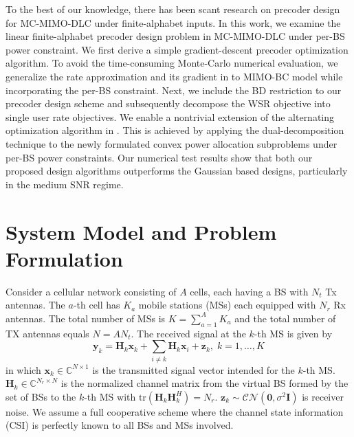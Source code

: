 \documentclass{article}
\begin{document}
To the best of our knowledge, there has been scant research on precoder design for MC-MIMO-DLC under finite-alphabet inputs.
In this work, we examine the linear finite-alphabet precoder design problem in MC-MIMO-DLC under per-BS power constraint.
We first derive a simple gradient-descent precoder optimization algorithm. To avoid the time-consuming Monte-Carlo numerical evaluation,
we generalize the rate approximation and its gradient in \cite{zeng2012low} to MIMO-BC model \cite{wu2012linear} while incorporating the per-BS constraint.
Next, we include the BD restriction to our precoder design scheme and subsequently decompose the WSR objective into single user rate objectives.
We enable a nontrivial extension of the alternating optimization algorithm in \cite{xiao2011globally}. This is achieved by applying the dual-decomposition technique \cite{zhang2010cooperative, palomar2006tutorial} to the newly formulated convex power allocation subproblems under per-BS power constraints.
Our numerical test results show that both our proposed design algorithms outperforms the Gaussian based designs,
particularly in the medium SNR regime.
\vspace*{-3mm}

\section{System Model and Problem Formulation}
\label{sec:mode}
\vspace*{-2mm}


Consider a cellular network consisting of $A$ cells, each having a BS with $N_t$ Tx antennas.
The $a$-th cell has $K_a$ mobile stations (MSs) each equipped with $N_r$ Rx antennas.
The total number of MSs is $K = \sum_{a=1}^AK_a$ and the total number of TX antennas equals $N=AN_t$.
The received signal at the $k$-th MS is given by
\begin{equation}
    \label{eq:channel}
    \mathbf{y}_k = \mathbf{H}_k\mathbf{x}_k+\sum_{i\not=k}\mathbf{H}_k\mathbf{x}_i+\mathbf{z}_k,\;k=1,\ldots,K
\end{equation}
in which $\mathbf{x}_k\in\mathbb{C}^{N\times1}$ is the transmitted signal vector intended for the $k$-th MS.
$\mathbf{H}_k\in\mathbb{C}^{N_r\times N}$ is the normalized channel matrix from the virtual BS formed by the set of
BSs to the $k$-th MS with $\mbox{tr}\left(\mathbf{H}_k\mathbf{H}_k^H\right)=N_r$. $\mathbf{z}_k\sim\mathcal{CN}(\mathbf{0},\sigma^2\mathbf{I})$ is receiver
noise. We assume a full cooperative scheme where the channel state information (CSI) is perfectly known to all BSs and MSs involved.
\end{document}
